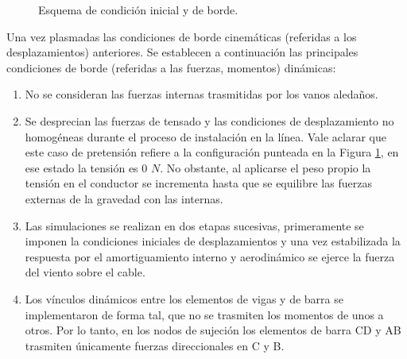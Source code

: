 \begin{figure}[htbp]
	\centering
	\def\svgwidth{80mm}
	
	\caption{Esquema de condición inicial y de borde.}
	\label{fig:MET:EsquemaCondiciones}
\end{figure}

Una vez plasmadas las condiciones de borde cinemáticas (referidas a los desplazamientos) anteriores. Se establecen a continuación las principales condiciones de borde (referidas a las fuerzas, momentos) dinámicas:

\begin{enumerate}
	\item  No se consideran las fuerzas internas trasmitidas por los vanos aledaños.
	\item  Se desprecian las fuerzas de tensado y las condiciones de desplazamiento no homogéneas durante el proceso de instalación en la línea. Vale aclarar que este caso de pretensión refiere a la configuración punteada en la Figura \ref{fig:MET:EsquemaCondiciones}, en ese estado la tensión es 0 $N$. No obstante, al aplicarse el peso propio la tensión en el conductor se incrementa hasta que se equilibre las fuerzas externas de la gravedad con las internas. 
	\item Las simulaciones se realizan en dos etapas sucesivas, primeramente se imponen la condiciones iniciales de desplazamientos y una vez estabilizada la respuesta por el amortiguamiento interno y aerodinámico se ejerce la fuerza del viento sobre el cable. 
	\item Los vínculos dinámicos entre los elementos de vigas y de barra se implementaron de forma tal, que no se trasmiten los momentos de unos a otros. Por lo tanto, en los nodos de sujeción los elementos de barra CD y AB trasmiten únicamente fuerzas direccionales en C y B. 
\end{enumerate} 




